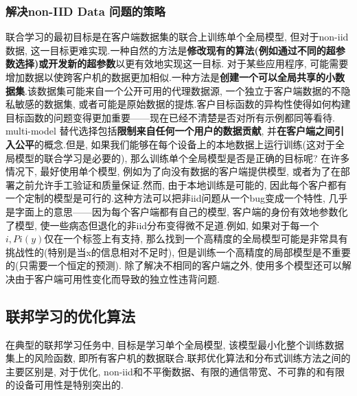 \documentclass[a4paper]{article}
\begin{document}
\subsubsection{解决non-IID Data 问题的策略}
联合学习的最初目标是在客户端数据集的联合上训练单个全局模型, 但对于non-iid数据, 这一目标更难实现.一种自然的方法是\textbf{修改现有的算法(例如通过不同的超参数选择)或开发新的超参数}以更有效地实现这一目标.
对于某些应用程序, 可能需要增加数据以使跨客户机的数据更加相似.一种方法是\textbf{创建一个可以全局共享的小数据集}.该数据集可能来自一个公开可用的代理数据源, 一个独立于客户端数据的不隐私敏感的数据集, 或者可能是原始数据的提炼.客户目标函数的异构性使得如何构建目标函数的问题变得更加重要——现在已经不清楚是否对所有示例都同等看待.
multi-model
替代选择包括\textbf{限制来自任何一个用户的数据贡献}, 并\textbf{在客户端之间引入公平}的概念.但是, 如果我们能够在每个设备上的本地数据上运行训练(这对于全局模型的联合学习是必要的), 那么训练单个全局模型是否是正确的目标呢? 
在许多情况下, 最好使用单个模型, 例如为了向没有数据的客户端提供模型, 或者为了在部署之前允许手工验证和质量保证.然而, 由于本地训练是可能的, 因此每个客户都有一个定制的模型是可行的.这种方法可以把非iid问题从一个bug变成一个特性, 几乎是字面上的意思——因为每个客户端都有自己的模型, 客户端的身份有效地参数化了模型, 使一些病态但退化的非iid分布变得微不足道.例如, 如果对于每一个$i,  Pi(y)$仅在一个标签上有支持, 那么找到一个高精度的全局模型可能是非常具有挑战性的(特别是当x的信息相对不足时), 但是训练一个高精度的局部模型是不重要的(只需要一个恒定的预测). 
除了解决不相同的客户端之外, 使用多个模型还可以解决由于客户端可用性变化而导致的独立性违背问题.
\subsection{联邦学习的优化算法}
在典型的联邦学习任务中, 目标是学习单个全局模型, 该模型最小化整个训练数据集上的风险函数, 即所有客户机的数据联合.联邦优化算法和分布式训练方法之间的主要区别是, 对于优化, non-iid和不平衡数据、有限的通信带宽、不可靠的和有限的设备可用性是特别突出的.
\end{document}
